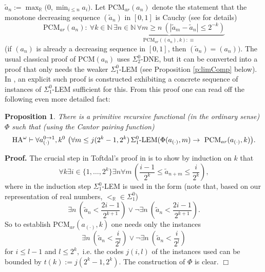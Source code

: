 \documentclass[1p]{elsarticle}
\newcommand{\RR}{\ensuremath{\mathbb{R}}}
\newcommand{\NN}{\ensuremath{\mathbb{N}}}
\theoremstyle{plain}
\newtheorem{prop}[thm]{Proposition}
\theoremstyle{definition}
\theoremstyle{remark}
\theoremstyle{definition}
\begin{document}
{$\tilde{a}_n:=\max_{\RR}\big(0,\min\nolimits_{i\le n}a_i\big).$ 
Let PCM$_{ar}(a_n)$ denote the statement that the monotone decreasing 
sequence $(\tilde{a}_n)$ in $[0,1]$ is Cauchy (see \cite{Kohlenbach(book)} 
for details) 
\[\mbox{PCM}_{ar}(a_n): \ \forall k\in\NN\,\underbrace{\exists n\in\NN\, 
\forall m\ge n\ (|\tilde{a}_m- \tilde{a}_n|\le 
2^{-k})}_{\mbox{PCM}_{ar}((a_n),k)
:\equiv} \]
(if $(a_n)$ is already 
a decreasing sequence in $[0,1]$, then $(\tilde{a}_n)=(a_n)).$ 
The usual classical proof of PCM$(a_n)$ uses $\Sigma^0_2$-DNE, but it can be 
converted into a proof that only needs the weaker $\Sigma^0_1$-LEM (see 
Proposition \ref{p:limComp} below). 
In \cite{Toftdal}, an explicit such proof is constructed 
exhibiting a concrete sequence of instances of $\Sigma^0_1$-LEM sufficient 
for this. From this proof one can read off the following even more detailed 
fact:
\begin{prop} There is a primitive recursive functional (in the 
ordinary sense) $\Phi$ such that (using the Cantor pairing function)
\[ \mbox{\rm HA}^{\omega}\vdash \forall a^{0\to 1}_{(\cdot)}, k^0\ 
\big( \forall m \le j(2^k-1,2^k) \,\Sigma^0_1\mbox{\rm -LEM}(\Phi(a_{(\cdot)},m)
\rightarrow 
\ \mbox{\rm PCM}_{ar}(a_{(\cdot)},k)\big). \] 
\end{prop} 
{\bf Proof.} The crucial step in Toftdal's proof in \cite{Toftdal} is 
to show by induction on $k$ that 
\[ \forall k\exists i\in \{ 1,\ldots,2^k\} \exists n \forall m \, 
\left( \frac{i-1}{2^k}\le \tilde{a}_{n+m}\le \frac{i}{2^k}\right), \]
where in the induction step $\Sigma^0_1$-LEM is used in the form 
(note that, based on our representation of real numbers, $<_{\RR}\in\Sigma^0_1$) 
\[\exists n\ \left( \tilde{a}_n <\frac{2i-1}{2^{k+1}}\right) \vee 
\neg \exists n\ \left( \tilde{a}_n <\frac{2i-1}{2^{k+1}}\right). \]
So to establish PCM$_{ar}(a_{(\cdot)},k)$ one needs only the instances 
\[\exists n\ \left( \tilde{a}_n <\frac{i}{2^{l}}\right) \vee 
\neg \exists n\ \left( \tilde{a}_n <\frac{i}{2^{l}}\right) \] 
for $i\le l-1$ and $l\le 2^k,$ i.e. the codes $j(i,l)$ of the instances 
used can be bounded by $t(k):=j(2^k-1,2^k).$  The construction of $\Phi$ is 
clear. 
 \hfill $\Box$ 

\mbox{ } 

}
\end{document}
